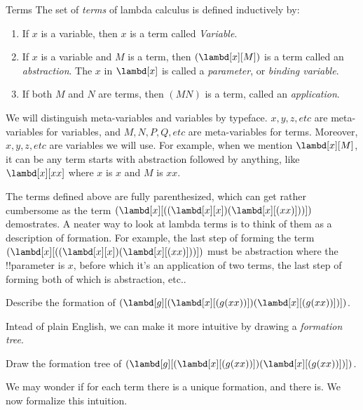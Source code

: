 \documentclass[../../../include/open-logic-section]{subfiles}
\begin{document}

\begin{defn}{Terms} 
The set of \emph{terms} of lambda calculus is defined inductively by:
\begin{enumerate}
  \item {} If $x$ is a variable, then $x$ is a
    term called \emph{Variable}.
  \item {} If $x$ is a variable and $M$ is a term, then $(\lambd[x][M])$ is
    a term called an \emph{abstraction}. The $x$ in
    $\lambd[x]$ is called a \emph{parameter}, or \emph{binding variable}.
  \item {} If both $M$ and $N$ are terms, then
    $(MN)$ is a term, called an \emph{application}.
\end{enumerate}
\end{defn}

We will distinguish meta-variables and variables by typeface. $x, y,
z, etc$ are meta-variables for variables, and $M, N, P, Q, etc$ are
meta-variables for terms. Moreover,  $x, y, z, etc$ are variables
we will use. For example, when we mention $\lambd[x][M]$, it can be
any term starts with abstraction followed by anything, like
$\lambd[x][x x]$ where $x$ is $x$ and $M$ is $x x$.


The terms defined above are fully parenthesized, which can get rather
cumbersome as the term $(\lambd[x][((\lambd[x][x])(\lambd[x][(xx)]))])$ demostrates. A neater way to look at lambda terms is to think of them as
a description of formation. For
example, the last step of forming the term $(\lambd[x][((\lambd[x][x])(\lambd[x][(xx)]))])$
must be abstraction where the !!{parameter} is $x$, before which it's
an application of two terms, the last step of forming both of which is
abstraction, etc.. 

\begin{prob}
  Describe the formation of $(\lambd[g][(\lambd[x][(g (x x))]) (\lambd[x][(g (x x))])])$.
\end{prob}

Intead of plain English, we can make it more intuitive by drawing a
\emph{formation tree}.

\begin{prob}
  Draw the formation tree of $(\lambd[g][(\lambd[x][(g (x x))]) (\lambd[x][(g (x x))])])$.
\end{prob}

We may wonder if for each term there is a unique formation, and there
is. We now formalize this intuition.
\end{document}
